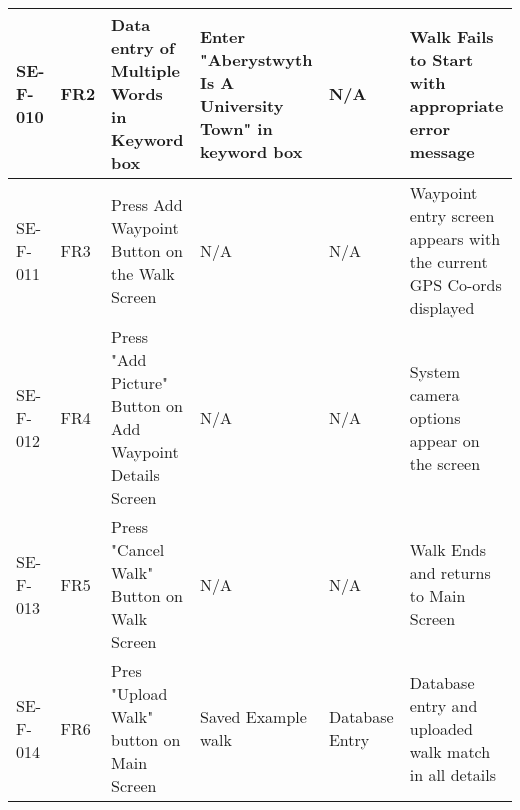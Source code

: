 \documentclass{article}
\begin{document}
\begin{longtable}{ | p{1cm} | p{1cm} | p{2.5cm} | p{2.5cm} | p{2.5cm} | p{2.5cm} |}
SE-F-010
& FR2
& Data entry of Multiple Words in Keyword box
& Enter "Aberystwyth Is A University Town" in keyword box
& N/A
& Walk Fails to Start with appropriate error message \\ \hline

SE-F-011
& FR3
& Press Add Waypoint Button on the Walk Screen
& N/A
& N/A
& Waypoint entry screen appears with the current GPS Co-ords displayed \\ \hline

SE-F-012
& FR4
& Press "Add Picture" Button on Add Waypoint Details Screen
& N/A
& N/A
& System camera options appear on the screen \\ \hline

SE-F-013
& FR5
& Press "Cancel Walk" Button on Walk Screen
& N/A
& N/A
& Walk Ends and returns to Main Screen \\ \hline

SE-F-014
& FR6
& Pres "Upload Walk" button on Main Screen
& Saved Example walk
& Database Entry
& Database entry and uploaded walk match in all details \\ \hline


\end{longtable}
\end{document}
